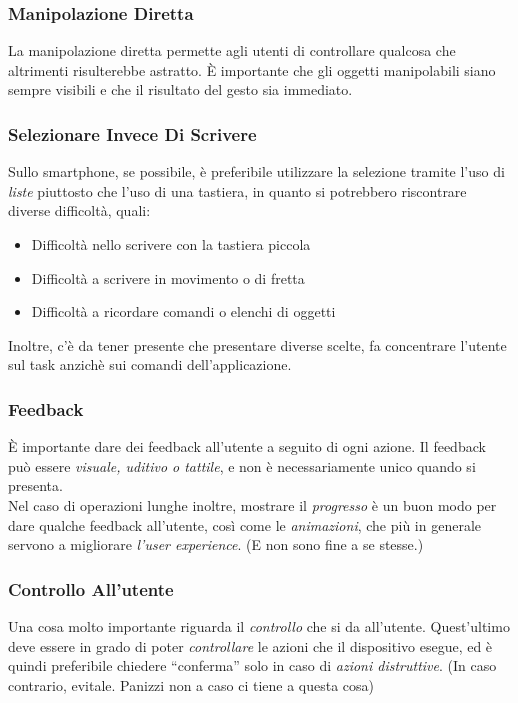 \documentclass[oneside]{book}
\begin{document}
			\subsubsection{Manipolazione Diretta} \label{sez:manipolazioneDiretta}
				La manipolazione diretta permette agli utenti di controllare qualcosa che altrimenti risulterebbe astratto. È importante che gli oggetti manipolabili siano sempre visibili e che il risultato del gesto sia immediato.

			\subsubsection{Selezionare Invece Di Scrivere} \label{sez:selezionaInveceDiScrivere}
				Sullo smartphone, se possibile, è preferibile utilizzare la selezione tramite l'uso di \emph{liste} piuttosto che l'uso di una tastiera, in quanto si potrebbero riscontrare diverse difficoltà, quali:
				\begin{itemize}
				\item Difficoltà nello scrivere con la tastiera piccola
				\item Difficoltà a scrivere in movimento o di fretta
				\item Difficoltà a ricordare comandi o elenchi di oggetti
				\end{itemize}
				Inoltre, c'è da tener presente che presentare diverse scelte, fa concentrare l’utente sul task anzichè sui comandi dell’applicazione.

			\subsubsection{Feedback} \label{sez:feedback}
				È importante dare dei feedback all'utente a seguito di ogni azione. Il feedback può essere \emph{visuale, uditivo o tattile}, e non è necessariamente unico quando si presenta. \\

				Nel caso di operazioni lunghe inoltre, mostrare il \emph{progresso} è un buon modo per dare qualche feedback all'utente, così come le \emph{animazioni}, che più in generale servono a migliorare \emph{l'user experience}. (E non sono fine a se stesse.)

			\subsubsection{Controllo All'utente} \label{sez:conotrolloUtente}
				Una cosa molto importante riguarda il \emph{controllo} che si da all'utente. Quest'ultimo deve essere in grado di poter \emph{controllare} le azioni che il dispositivo esegue, ed è quindi preferibile chiedere ``conferma'' solo in caso di \emph{azioni distruttive}. (In caso contrario, evitale. Panizzi non a caso ci tiene a questa cosa) \\
\end{document}
